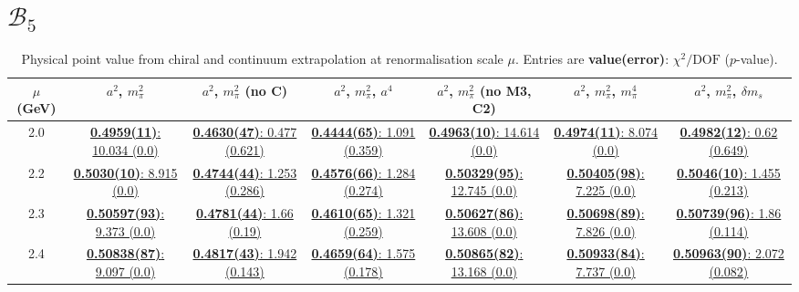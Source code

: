 \documentclass[12pt]{extarticle}
\begin{document}
\section{$\mathcal{B}_5$}
\begin{table}[h!]
\begin{center}
\begin{tabular}{|c|c|c|c|c|c|c|}
\hline
$\mu$ (GeV) & $a^2$, $m_\pi^2$& $a^2$, $m_\pi^2$ (no C)& $a^2$, $m_\pi^2$, $a^4$& $a^2$, $m_\pi^2$ (no M3, C2)& $a^2$, $m_\pi^2$, $m_\pi^4$& $a^2$, $m_\pi^2$, $\delta m_s$\\
\hline
2.0& \hyperlink{TT/SUSY/bag_a2m2_20.pdf.1}{\textbf{0.4959(11)}: 10.034 (0.0)} & \hyperlink{TT/SUSY/bag_a2m2noC_20.pdf.1}{\textbf{0.4630(47)}: 0.477 (0.621)} & \hyperlink{TT/SUSY/bag_a2a4m2_20.pdf.1}{\textbf{0.4444(65)}: 1.091 (0.359)} & \hyperlink{TT/SUSY/bag_a2m2mcut_20.pdf.1}{\textbf{0.4963(10)}: 14.614 (0.0)} & \hyperlink{TT/SUSY/bag_a2m2m4_20.pdf.1}{\textbf{0.4974(11)}: 8.074 (0.0)} & \hyperlink{TT/SUSY/bag_a2m2delm_20.pdf.1}{\textbf{0.4982(12)}: 0.62 (0.649)}\\
2.2& \hyperlink{TT/SUSY/bag_a2m2_22.pdf.1}{\textbf{0.5030(10)}: 8.915 (0.0)} & \hyperlink{TT/SUSY/bag_a2m2noC_22.pdf.1}{\textbf{0.4744(44)}: 1.253 (0.286)} & \hyperlink{TT/SUSY/bag_a2a4m2_22.pdf.1}{\textbf{0.4576(66)}: 1.284 (0.274)} & \hyperlink{TT/SUSY/bag_a2m2mcut_22.pdf.1}{\textbf{0.50329(95)}: 12.745 (0.0)} & \hyperlink{TT/SUSY/bag_a2m2m4_22.pdf.1}{\textbf{0.50405(98)}: 7.225 (0.0)} & \hyperlink{TT/SUSY/bag_a2m2delm_22.pdf.1}{\textbf{0.5046(10)}: 1.455 (0.213)}\\
2.3& \hyperlink{TT/SUSY/bag_a2m2_23.pdf.1}{\textbf{0.50597(93)}: 9.373 (0.0)} & \hyperlink{TT/SUSY/bag_a2m2noC_23.pdf.1}{\textbf{0.4781(44)}: 1.66 (0.19)} & \hyperlink{TT/SUSY/bag_a2a4m2_23.pdf.1}{\textbf{0.4610(65)}: 1.321 (0.259)} & \hyperlink{TT/SUSY/bag_a2m2mcut_23.pdf.1}{\textbf{0.50627(86)}: 13.608 (0.0)} & \hyperlink{TT/SUSY/bag_a2m2m4_23.pdf.1}{\textbf{0.50698(89)}: 7.826 (0.0)} & \hyperlink{TT/SUSY/bag_a2m2delm_23.pdf.1}{\textbf{0.50739(96)}: 1.86 (0.114)}\\
2.4& \hyperlink{TT/SUSY/bag_a2m2_24.pdf.1}{\textbf{0.50838(87)}: 9.097 (0.0)} & \hyperlink{TT/SUSY/bag_a2m2noC_24.pdf.1}{\textbf{0.4817(43)}: 1.942 (0.143)} & \hyperlink{TT/SUSY/bag_a2a4m2_24.pdf.1}{\textbf{0.4659(64)}: 1.575 (0.178)} & \hyperlink{TT/SUSY/bag_a2m2mcut_24.pdf.1}{\textbf{0.50865(82)}: 13.168 (0.0)} & \hyperlink{TT/SUSY/bag_a2m2m4_24.pdf.1}{\textbf{0.50933(84)}: 7.737 (0.0)} & \hyperlink{TT/SUSY/bag_a2m2delm_24.pdf.1}{\textbf{0.50963(90)}: 2.072 (0.082)}\\
\hline
\end{tabular}
\caption{Physical point value from chiral and continuum extrapolation at renormalisation scale $\mu$. Entries are \textbf{value(error)}: $\chi^2/\text{DOF}$ ($p$-value).}
\end{center}
\end{table}
\end{document}
